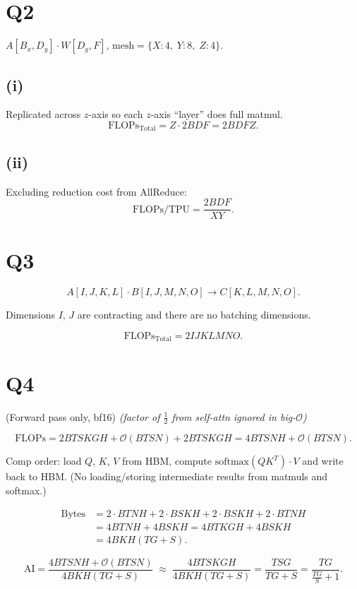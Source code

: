 \documentclass[11pt]{article}
\newcommand{\flops}{\text{FLOPs}}
\begin{document}
\section*{Q2}

$A[B_x, D_y] \cdot W[D_y, F]$, \quad $\text{mesh} = \{X{:}4,\; Y{:}8,\; Z{:}4\}$.

\subsection*{(i)}
Replicated across $z$-axis so each $z$-axis ``layer'' does full matmul.
\[
\flops_{\text{Total}} = Z \cdot 2BDF = 2BDFZ.
\]

\subsection*{(ii)}
Excluding reduction cost from AllReduce:
\[
\flops / \text{TPU} = \frac{2BDF}{XY}.
\]

\section*{Q3}

\[
A[I, J, K, L] \cdot B[I, J, M, N, O] \to C[K, L, M, N, O].
\]

Dimensions $I$, $J$ are contracting and there are no batching dimensions.

\[
\flops_{\text{Total}} = 2IJKLMNO.
\]

\section*{Q4}

(Forward pass only, bf16) \quad
\emph{(factor of $\tfrac{1}{2}$ from self-attn ignored in big-$\mathcal{O}$)}

\[
\flops = 2BTSKGH + \mathcal{O}(BTSN) + 2BTSKGH = 4BTSNH + \mathcal{O}(BTSN).
\]

Comp order: load $Q$, $K$, $V$ from HBM, compute $\text{softmax}(QK^T) \cdot V$ and write back to HBM. (No loading/storing intermediate results from matmuls and softmax.)

\begin{align*}
\text{Bytes} &= 2 \cdot BTNH + 2 \cdot BSKH + 2 \cdot BSKH + 2 \cdot BTNH \\
             &= 4BTNH + 4BSKH = 4BTKGH + 4BSKH \\
             &= 4BKH(TG + S).
\end{align*}

\[
\text{AI} = \frac{4BTSNH + \mathcal{O}(BTSN)}{4BKH(TG + S)}
\;\approx\; \frac{4BTSKGH}{4BKH(TG + S)}
= \frac{TSG}{TG + S}
= \frac{TG}{\tfrac{TG}{S} + 1}.
\]
\end{document}

